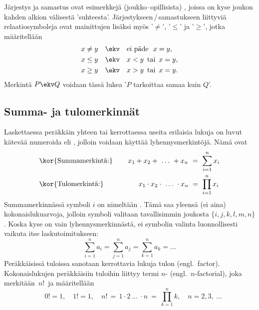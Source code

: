 %
Järjestys ja samastus ovat esimerkkejä (joukko--opillisista) , joissa on kyse
joukon kahden alkion välisestä 'suhteesta'. Järjestykseen\,/\,samastukseen liittyviä
relaatiosymboleja ovat mainittujen lisäksi myös '$\neq$', '$\le$' ja '$\ge$', jotka määritellään
\begin{align*}
x \neq y \quad &\ekv \quad \text{ei päde}\ \ x=y, \\
x \le y  \quad &\ekv \quad x < y\,\ \text{tai}\,\ x = y, \\
x \ge y  \quad &\ekv \quad x > y\,\ \text{tai}\,\ x = y.
\end{align*}
Merkintä $P \ekv Q$ voidaan tässä lukea '$P$ tarkoittaa samaa kuin $Q$'.

\subsection*{Summa- ja tulomerkinnät}

Laskettaessa peräkkäin yhteen tai kerrottaessa useita erilaisia lukuja on luvut kätevää 
numeroida eli , jolloin voidaan käyttää lyhennysmerkintöjä. Nämä ovat 
\begin{align*}
&\text{\kor{Summamerkintä:}} \qquad\, x_1 + x_2 + \ \ldots\  + x_n\ =\ \sum_{i=1}^n x_i \\
&\text{\kor{Tulomerkintä:}} \qquad\qquad\quad x_1 \cdot x_2 \cdot\ \ldots\ \cdot x_n\ 
                                                                    =\ \prod_{i=1}^n x_i
\end{align*}
%
Summamerkinnässä symboli $i$ on nimeltään . Tämä saa yleensä (ei aina)
kokonaislukuarvoja, jolloin symboli valitaan tavallisimmin joukosta $\{i,j,k,l,m,n\}$.
Koska kyse on vain lyhennysmerkinnästä, ei symbolin valinta luonnollisesti vaikuta itse 
laskutoimitukseen:
\[
\sum_{i=1}^n a_i = \sum_{j=1}^n a_j = \sum_{k=1}^n a_k = \ldots
\]
Peräkkäisissä tuloissa sanotaan kerrottavia lukuja tulon  (engl.\ factor).
Kokonaislukujen peräkkäisiin tuloihin liittyy termi 
$n$- (engl.\ $n$-factorial),
joka merkitään $\,n!\,$ ja määritellään
\[
\quad 0! = 1, \quad 1! = 1, \quad n!\,=\,1 \cdot 2 \ \ldots\ \cdot n\ 
                                      =\ \prod_{k=1}^n k, \quad n = 2,3,\ \ldots
\]

